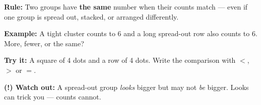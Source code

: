 \documentclass[12pt]{article}
\begin{document}

\begin{formulabox}
\textbf{Rule:} Two groups have \textbf{the same} number when their counts
match --- even if one group is spread out, stacked, or arranged differently.
\end{formulabox}

\begin{examplebox}
\textbf{Example:} \quad A tight cluster counts to 6 and a long spread-out row
also counts to 6. More, fewer, or the same?
\end{examplebox}

\begin{tryitbox}
\textbf{Try it:} \quad A square of 4 dots and a row of 4 dots. Write the
comparison with $<$, $>$ or $=$.\\[2pt]
\end{tryitbox}

\begin{watchoutbox}
\textbf{(!) Watch out:} A spread-out group \emph{looks} bigger but may not
\emph{be} bigger. Looks can trick you --- counts cannot.
\end{watchoutbox}
\end{document}
